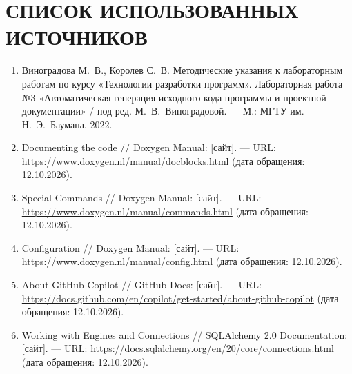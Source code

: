 \section*{СПИСОК ИСПОЛЬЗОВАННЫХ ИСТОЧНИКОВ}

\begin{enumerate}
	\item Виноградова М.~В., Королев С.~В.
	Методические указания к лабораторным работам по курсу
	«Технологии разработки программ».
	Лабораторная работа №3 «Автоматическая генерация исходного кода программы
	и проектной документации» / под ред. М.~В.~Виноградовой.
	--- М.: МГТУ им. Н.~Э.~Баумана, 2022.

	\item Documenting the code // Doxygen Manual: [сайт]. --- URL:
	\url{https://www.doxygen.nl/manual/docblocks.html}
	(дата обращения: 12.10.2026).

	\item Special Commands // Doxygen Manual: [сайт]. --- URL:
	\url{https://www.doxygen.nl/manual/commands.html}
	(дата обращения: 12.10.2026).

	\item Configuration // Doxygen Manual: [сайт]. --- URL:
	\url{https://www.doxygen.nl/manual/config.html}
	(дата обращения: 12.10.2026).

	\item About GitHub Copilot // GitHub Docs: [сайт]. --- URL:
	\url{https://docs.github.com/en/copilot/get-started/about-github-copilot}
	(дата обращения: 12.10.2026).

	\item Working with Engines and Connections // SQLAlchemy 2.0 Documentation:
	[сайт]. --- URL:
	\url{https://docs.sqlalchemy.org/en/20/core/connections.html}
	(дата обращения: 12.10.2026).
\end{enumerate}
